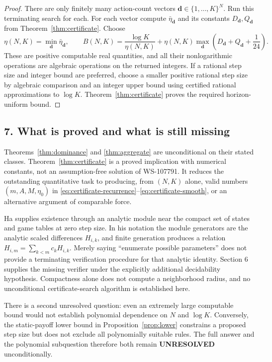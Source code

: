 \documentclass[11pt]{article}
\begin{document}
\begin{proof}
There are only finitely many action-count vectors
$\mathbf d\in\{1,\ldots,K\}^N$. Run this terminating search for each.
For each vector compute $\bar\eta_{\mathbf d}$ and its constants
$D_{\mathbf d},Q_{\mathbf d}$ from Theorem~\ref{thm:certificate}.
Choose
\[
 \eta(N,K)=\min_{\mathbf d}\bar\eta_{\mathbf d},\qquad
 B(N,K)=\frac{\log K}{\eta(N,K)}
     +\eta(N,K)\max_{\mathbf d}
                 \left(D_{\mathbf d}+Q_{\mathbf d}+\frac1{24}\right).
\]
These are positive computable real quantities, and all their nonlogarithmic
operations are algebraic operations on the returned integers. If a
rational step size and integer bound are preferred, choose a smaller
positive rational step size by algebraic comparison and an integer upper
bound using certified rational approximations to $\log K$.
Theorem~\ref{thm:certificate} proves the required horizon-uniform bound.
\end{proof}

\subsection*{7. What is proved and what is still missing}
Theorems~\ref{thm:dominance} and \ref{thm:aggregate} are unconditional
on their stated classes. Theorem~\ref{thm:certificate} is a proved
implication with numerical constants, not an assumption-free solution of
WS-107791. It reduces the outstanding quantitative task to producing,
from $(N,K)$ alone, valid numbers $(m,A,M,\eta_0)$ in
\eqref{eq:certificate-recurrence}--\eqref{eq:certificate-smooth}, or
an alternative argument of comparable force.

Ha supplies existence through an analytic module near the compact set of
states and game tables at zero step size. In his notation the module
generators are the analytic scaled differences $H_{i,k}$, and finite
generation produces a relation $H_{i,m}=\sum_{k<m}c_kH_{i,k}$.
Merely saying ``enumerate possible parameters'' does not provide a
terminating verification procedure for that analytic identity. Section 6
supplies the missing verifier under the explicitly additional decidability
hypothesis. Compactness alone does not compute a neighborhood radius, and
no unconditional certificate-search algorithm is established here.

There is a second unresolved question: even an extremely large computable
bound would not establish polynomial dependence on $N$ and $\log K$.
Conversely, the static-payoff lower bound in
Proposition~\ref{prop:lower} constrains a proposed step size but does not
exclude all polynomially suitable rules. The full answer and the polynomial
subquestion therefore both remain \textbf{UNRESOLVED} unconditionally.
\end{document}

